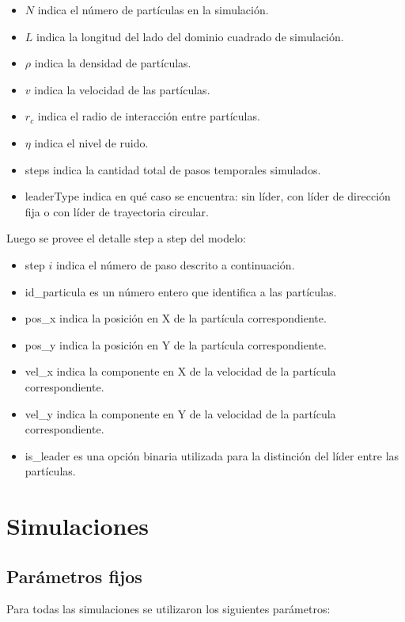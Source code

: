 \documentclass[a4paper,12pt]{article}
\begin{document}
\begin{itemize}
	\item $N$ indica el número de partículas en la simulación.
	\item $L$ indica la longitud del lado del dominio cuadrado de simulación.
	\item $\rho$ indica la densidad de partículas.
	\item $v$ indica la velocidad de las partículas.
	\item $r_c$ indica el radio de interacción entre partículas.
	\item $\eta$ indica el nivel de ruido.
	\item steps indica la cantidad total de pasos temporales simulados.
	\item leaderType indica en qué caso se encuentra: sin líder, con líder de dirección fija o con líder de trayectoria circular.
\end{itemize}

Luego se provee el detalle step a step del modelo:

\begin{itemize}
	\item step $i$ indica el número de paso descrito a continuación.
	\item id\_particula es un número entero que identifica a las partículas.
	\item pos\_x indica la posición en X de la partícula correspondiente.
	\item pos\_y indica la posición en Y de la partícula correspondiente.
	\item vel\_x indica la componente en X de la velocidad de la partícula correspondiente.
	\item vel\_y indica la componente en Y de la velocidad de la partícula correspondiente.
	\item is\_leader es una opción binaria utilizada para la distinción del líder entre las partículas.
\end{itemize}

\section{Simulaciones}

\subsection{Parámetros fijos}

Para todas las simulaciones se utilizaron los siguientes parámetros:
\end{document}
